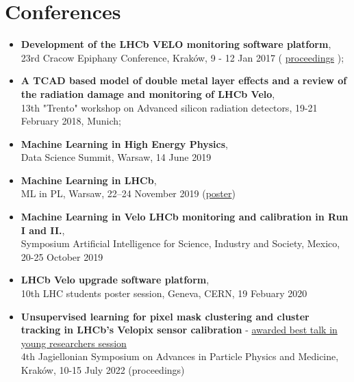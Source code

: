 \section*{Conferences}

\begin{itemize}
  \item \textbf{Development of the LHCb VELO monitoring software platform},
        \\ 23rd Cracow Epiphany Conference, Kraków, 9 - 12 Jan 2017
        (
        \href{http://dx.doi.org/10.5506/APhysPolB.48.1061}{proceedings}
        );
  \item \textbf{A TCAD based model of double metal layer effects and a review of the radiation damage and monitoring of LHCb Velo},
        \\ 13th "Trento"  workshop on Advanced silicon radiation detectors, 19-21 February 2018, Munich;
  \item \textbf{Machine Learning in High Energy Physics},\\ Data Science Summit, Warsaw, 14 June 2019
    \item \textbf{Machine Learning in LHCb},\\ML in PL, Warsaw, 22–24 November 2019 (\href{http://docs.mlinpl.org/conference/2019/posters/MaciejMajewski.pdf}{poster})
    \item \textbf{Machine Learning in Velo LHCb monitoring and calibration in Run I and II.},\\Symposium Artificial Intelligence for Science, Industry and Society, Mexico, 20-25 October 2019
    \item \textbf{LHCb Velo upgrade software platform},\\10th LHC students poster session, Geneva, CERN, 19 Febuary 2020
    \item \textbf{Unsupervised learning for pixel mask clustering and cluster tracking
in LHCb’s Velopix sensor calibration} - \underline{awarded best talk in young researchers session} \\4th Jagiellonian Symposium on Advances in Particle Physics and Medicine, Kraków, 10-15 July 2022 (proceedings)

\end{itemize}

